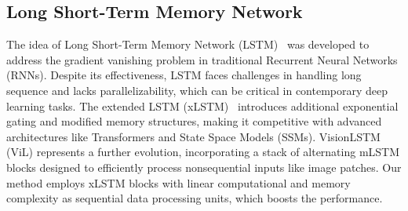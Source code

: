 \subsection{Long Short-Term Memory Network}
The idea of Long Short-Term Memory Network (LSTM)~\cite{hochreiter1997long} was developed to address the gradient vanishing problem in traditional Recurrent Neural Networks (RNNs). 
Despite its effectiveness, LSTM faces challenges in handling long sequence and lacks parallelizability, which can be critical in contemporary deep learning tasks.
The extended LSTM (xLSTM)~\cite{beck2024xlstm} introduces additional exponential gating and modified memory structures, making it competitive with advanced architectures like Transformers and State Space Models (SSMs).
VisionLSTM~\cite{alkin2024visionlstm} (ViL) represents a further evolution, incorporating a stack of alternating mLSTM blocks designed to efficiently process nonsequential inputs like image patches.
Our method employs xLSTM blocks with linear computational and memory complexity as sequential data processing units, which boosts the performance.
